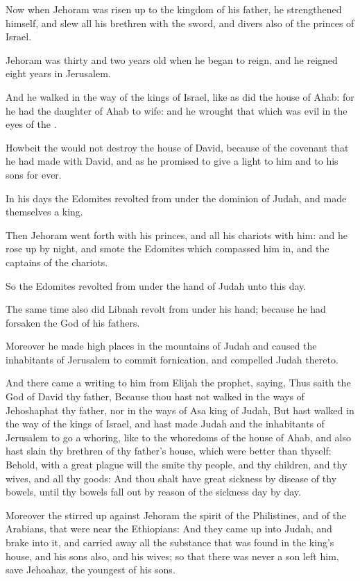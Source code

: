 \Verse Now when Jehoram was risen up to the kingdom of his father, he strengthened himself, and slew all his brethren with the sword, and divers also of the princes of Israel.

\Verse Jehoram was thirty and two years old when he began to reign, and he reigned eight years in Jerusalem.

\Verse And he walked in the way of the kings of Israel, like as did the house of Ahab: for he had the daughter of Ahab to wife: and he wrought that which was evil in the eyes of the \LORD.

\Verse Howbeit the \LORD would not destroy the house of David, because of the covenant that he had made with David, and as he promised to give a light to him and to his sons for ever.

\Verse In his days the Edomites revolted from under the dominion of Judah, and made themselves a king.

\Verse Then Jehoram went forth with his princes, and all his chariots with him: and he rose up by night, and smote the Edomites which compassed him in, and the captains of the chariots.

\Verse So the Edomites revolted from under the hand of Judah unto this day.

The same time also did Libnah revolt from under his hand; because he had forsaken the \LORD God of his fathers.

\Verse Moreover he made high places in the mountains of Judah and caused the inhabitants of Jerusalem to commit fornication, and compelled Judah thereto.

\Verse And there came a writing to him from Elijah the prophet, saying, Thus saith the \LORD God of David thy father, Because thou hast not walked in the ways of Jehoshaphat thy father, nor in the ways of Asa king of Judah, \Verse But hast walked in the way of the kings of Israel, and hast made Judah and the inhabitants of Jerusalem to go a whoring, like to the whoredoms of the house of Ahab, and also hast slain thy brethren of thy father's house, which were better than thyself: \Verse Behold, with a great plague will the \LORD smite thy people, and thy children, and thy wives, and all thy goods: \Verse And thou shalt have great sickness by disease of thy bowels, until thy bowels fall out by reason of the sickness day by day.

\Verse Moreover the \LORD stirred up against Jehoram the spirit of the Philistines, and of the Arabians, that were near the Ethiopians: \Verse And they came up into Judah, and brake into it, and carried away all the substance that was found in the king's house, and his sons also, and his wives; so that there was never a son left him, save Jehoahaz, the youngest of his sons.

